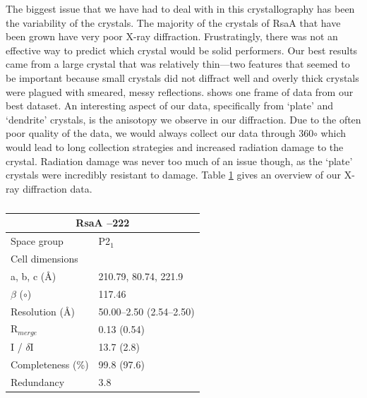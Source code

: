 The biggest issue that we have had to deal with in this crystallography has been the variability of the crystals. The majority of the crystals of RsaA that have been grown have very poor X-ray diffraction. Frustratingly, there was not an effective way to predict which crystal would be  solid performers. Our best results came from a large crystal that was relatively thin---two features that seemed to be important because small crystals did not diffract well and overly thick crystals were plagued with smeared, messy reflections.  shows one frame of data from our best dataset. An interesting aspect of our data, specifically from `plate' and `dendrite' crystals, is the anisotopy we observe in our diffraction. Due to the often poor quality of the data, we would always collect our data through 360$\circ$ which would lead to long collection strategies and increased radiation damage to the crystal. Radiation damage was never too much of an issue though, as the `plate' crystals were incredibly resistant to damage. Table \ref{tab:diffractiondata} gives an overview of our X-ray diffraction data.

        \begin{table}[p]
            \caption[Summary data from our X-ray diffraction of RsaA --222]{ }
            \begin{center}
                \begin{tabular}{@{}ll@{}}
                    \toprule
										\multicolumn{2}{c}{RsaA \del 0--222}			 \\ \midrule
										Space group				& P2$_{1}$							 \\
										Cell dimensions		&												 \\
										a, b, c (\AA)				& 210.79, 80.74, 221.9	 \\
										$\beta$ ($\circ$)							& 117.46								 \\
										Resolution (\AA)		& 50.00--2.50 (2.54--2.50) \\
										R$_{merge}$				& 0.13 (0.54)						 \\
										I / $\delta$I						 & 13.7 (2.8)							\\
										Completeness (\%) & 99.8 (97.6)						\\
										Redundancy				& 3.8										 \\ \bottomrule
               \end{tabular}
            \end{center}
            \label{tab:diffractiondata}
        \end{table}   
 
